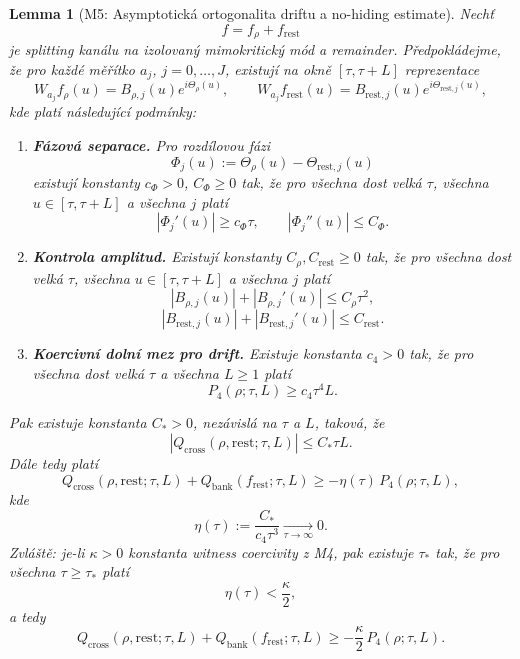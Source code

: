 \documentclass[11pt,a4paper]{article}
\newtheorem{lemma}[theorem]{Lemma}
\begin{document}
\begin{lemma}[M5: Asymptotická ortogonalita driftu a no-hiding estimate]
Nechť
\[
f=f_\rho+f_{\mathrm{rest}}
\]
je splitting kanálu na izolovaný mimokritický mód a remainder.
Předpokládejme, že pro každé měřítko \(a_j\), \(j=0,\dots,J\), existují na okně
\([\tau,\tau+L]\) reprezentace
\[
W_{a_j}f_\rho(u)=B_{\rho,j}(u)e^{i\Theta_\rho(u)},
\qquad
W_{a_j}f_{\mathrm{rest}}(u)=B_{\mathrm{rest},j}(u)e^{i\Theta_{\mathrm{rest},j}(u)},
\]
kde platí následující podmínky:

\begin{enumerate}[label=\textbf{(\arabic*)}]
    \item \textbf{Fázová separace.}
    Pro rozdílovou fázi
    \[
    \Phi_j(u):=\Theta_\rho(u)-\Theta_{\mathrm{rest},j}(u)
    \]
    existují konstanty \(c_\Phi>0\), \(C_\Phi\ge 0\) tak, že pro všechna dost velká \(\tau\),
    všechna \(u\in[\tau,\tau+L]\) a všechna \(j\) platí
    \[
    |\Phi_j'(u)|\ge c_\Phi \tau,
    \qquad
    |\Phi_j''(u)|\le C_\Phi.
    \]

    \item \textbf{Kontrola amplitud.}
    Existují konstanty \(C_\rho,C_{\mathrm{rest}}\ge 0\) tak, že pro všechna dost velká \(\tau\),
    všechna \(u\in[\tau,\tau+L]\) a všechna \(j\) platí
    \[
    |B_{\rho,j}(u)|+|B_{\rho,j}'(u)|\le C_\rho \tau^2,
    \]
    \[
    |B_{\mathrm{rest},j}(u)|+|B_{\mathrm{rest},j}'(u)|\le C_{\mathrm{rest}}.
    \]

    \item \textbf{Koercivní dolní mez pro drift.}
    Existuje konstanta \(c_4>0\) tak, že pro všechna dost velká \(\tau\) a všechna \(L\ge 1\) platí
    \[
    P_4(\rho;\tau,L)\ge c_4\tau^4L.
    \]
\end{enumerate}

Pak existuje konstanta \(C_*>0\), nezávislá na \(\tau\) a \(L\), taková, že
\[
|Q_{\mathrm{cross}}(\rho,\mathrm{rest};\tau,L)|\le C_* \tau L.
\]
Dále tedy platí
\[
Q_{\mathrm{cross}}(\rho,\mathrm{rest};\tau,L)
+
Q_{\mathrm{bank}}(f_{\mathrm{rest}};\tau,L)
\ge
-\eta(\tau)\,P_4(\rho;\tau,L),
\]
kde
\[
\eta(\tau):=\frac{C_*}{c_4\tau^3}\xrightarrow[\tau\to\infty]{}0.
\]
Zvláště: je-li \(\kappa>0\) konstanta witness coercivity z M4, pak existuje \(\tau_*\) tak, že pro
všechna \(\tau\ge \tau_*\) platí
\[
\eta(\tau)<\frac{\kappa}{2},
\]
a tedy
\[
Q_{\mathrm{cross}}(\rho,\mathrm{rest};\tau,L)
+
Q_{\mathrm{bank}}(f_{\mathrm{rest}};\tau,L)
\ge
-\frac{\kappa}{2}\,P_4(\rho;\tau,L).
\]
\end{lemma}
\end{document}
